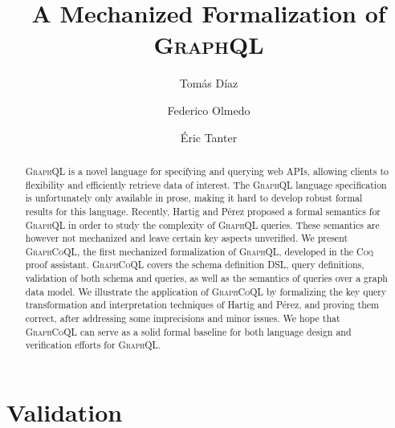 \documentclass[sigplan,10pt,anonymous,review,nonacm]{acmart}
\newcommand{\mynote}[3]
    {{\color{#3} \fbox{\bfseries\sffamily\scriptsize#1}
    {\small$\blacktriangleright$\textsf{\emph{#2}}$\blacktriangleleft$}}~}
\newcommand{\et}[1]{\mynote{ET}{#1}{purple}}
\newcommand{\td}[1]{\mynote{TD}{#1}{blue}}
\newcommand{\plstyle}[1]{\mbox{\textsc{#1}}\xspace}
\newcommand{\gql}{\plstyle{GraphQL}}
\newcommand{\gcoql}{\plstyle{GraphCoQL}}
\newcommand{\coq}{\plstyle{Coq}}
\begin{document}
\title{A Mechanized Formalization of \gql}
\author{Tomás Díaz}

\author{Federico Olmedo}
\author{Éric Tanter}

\begin{abstract}
\gql is a novel language for specifying and querying web APIs, allowing clients to flexibility and efficiently retrieve data of interest. The \gql language specification is unfortunately only available in prose, making it hard to develop robust formal results for this language. Recently, Hartig and Pérez proposed a formal semantics for \gql in order to study the complexity of \gql queries. These semantics are however not mechanized and leave certain key aspects unverified. We present \gcoql, the first mechanized formalization of \gql, developed in the \coq proof assistant.  \gcoql covers the schema definition DSL, query definitions, validation of both schema and queries, as well as the semantics of queries over a graph data model.
We illustrate the application of \gcoql by formalizing the key query transformation and interpretation techniques of Hartig and Pérez, and proving them correct, after addressing some imprecisions and minor issues. 
We hope that \gcoql can serve as a solid formal baseline for both language design and verification efforts for \gql.
\end{abstract}


\maketitle






%

\section{Validation}\label{sec:valid}

\end{document}
